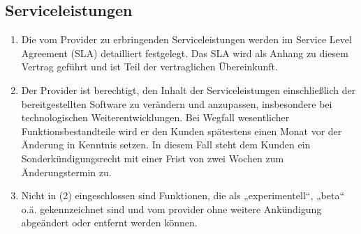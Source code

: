 \documentclass{terms}
\begin{document}
\subsection{Serviceleistungen}
\begin{enumerate}
\item Die vom Provider zu erbringenden Serviceleistungen werden im Service Level Agreement (SLA) detailliert festgelegt. Das SLA wird als Anhang zu diesem Vertrag geführt und ist Teil der vertraglichen Übereinkunft.
\item Der Provider ist berechtigt, den Inhalt der Serviceleistungen einschließlich der bereitgestellten Software zu verändern und anzupassen, insbesondere bei technologischen Weiterentwicklungen. Bei Wegfall wesentlicher Funktionsbestandteile wird er den Kunden spätestens einen Monat vor der Änderung in Kenntnis setzen. In diesem Fall steht dem Kunden ein Sonderkündigungsrecht mit einer Frist von zwei Wochen zum Änderungstermin zu.
\item Nicht in (2) eingeschlossen sind Funktionen, die als „experimentell“, „beta“ o.ä. gekennzeichnet sind und vom provider ohne weitere Ankündigung abgeändert oder entfernt werden können.
\end{enumerate}
\end{document}
